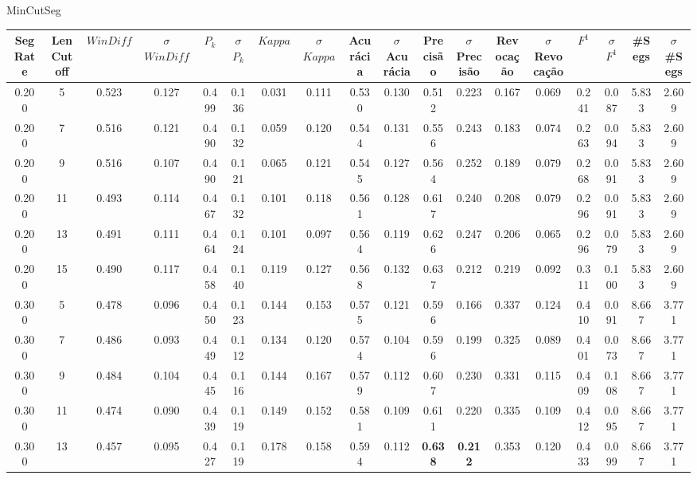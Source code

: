  \newpage
 \center MinCutSeg
\begin{longtable}[c]{|c|c|c|c|c|c|c|c|c|c|c|c|c|c|c|c|c|c|} 
\hline 
 Seg Rate & LenCutoff & $WinDiff$ & $\sigma$$WinDiff$ & $P_k$ & $\sigma$$P_k$ & $Kappa$ & $\sigma$$Kappa$ & Acurácia & $\sigma$Acurácia & Precisão & $\sigma$Precisão & Revocação & $\sigma$Revocação & $F^1$ & $\sigma$$F^1$ & \#Segs & $\sigma$\#Segs\\ \hline 
 0.200 & 5 & 0.523 & 0.127 & 0.499 & 0.136 & 0.031 & 0.111 & 0.530 & 0.130 & 0.512 & 0.223 & 0.167 & 0.069 & 0.241 & 0.087 & 5.833 & 2.609  \\ \hline 
  0.200 & 7 & 0.516 & 0.121 & 0.490 & 0.132 & 0.059 & 0.120 & 0.544 & 0.131 & 0.556 & 0.243 & 0.183 & 0.074 & 0.263 & 0.094 & 5.833 & 2.609  \\ \hline 
  0.200 & 9 & 0.516 & 0.107 & 0.490 & 0.121 & 0.065 & 0.121 & 0.545 & 0.127 & 0.564 & 0.252 & 0.189 & 0.079 & 0.268 & 0.091 & 5.833 & 2.609  \\ \hline 
  0.200 & 11 & 0.493 & 0.114 & 0.467 & 0.132 & 0.101 & 0.118 & 0.561 & 0.128 & 0.617 & 0.240 & 0.208 & 0.079 & 0.296 & 0.091 & 5.833 & 2.609  \\ \hline 
  0.200 & 13 & 0.491 & 0.111 & 0.464 & 0.124 & 0.101 & 0.097 & 0.564 & 0.119 & 0.626 & 0.247 & 0.206 & 0.065 & 0.296 & 0.079 & 5.833 & 2.609  \\ \hline 
  0.200 & 15 & 0.490 & 0.117 & 0.458 & 0.140 & 0.119 & 0.127 & 0.568 & 0.132 & 0.637 & 0.212 & 0.219 & 0.092 & 0.311 & 0.100 & 5.833 & 2.609  \\ \hline 
  0.300 & 5 & 0.478 & 0.096 & 0.450 & 0.123 & 0.144 & 0.153 & 0.575 & 0.121 & 0.596 & 0.166 & 0.337 & 0.124 & 0.410 & 0.091 & 8.667 & 3.771  \\ \hline 
  0.300 & 7 & 0.486 & 0.093 & 0.449 & 0.112 & 0.134 & 0.120 & 0.574 & 0.104 & 0.596 & 0.199 & 0.325 & 0.089 & 0.401 & 0.073 & 8.667 & 3.771  \\ \hline 
  0.300 & 9 & 0.484 & 0.104 & 0.445 & 0.116 & 0.144 & 0.167 & 0.579 & 0.112 & 0.607 & 0.230 & 0.331 & 0.115 & 0.409 & 0.108 & 8.667 & 3.771  \\ \hline 
  0.300 & 11 & 0.474 & 0.090 & 0.439 & 0.119 & 0.149 & 0.152 & 0.581 & 0.109 & 0.611 & 0.220 & 0.335 & 0.109 & 0.412 & 0.095 & 8.667 & 3.771  \\ \hline 
  0.300 & 13 & 0.457 & 0.095 & 0.427 & 0.119 & 0.178 & 0.158 & 0.594 & 0.112 & \cellcolor{gray!20} \textbf{0.638} & \cellcolor{gray!20} \textbf{0.212} & 0.353 & 0.120 & 0.433 & 0.099 & 8.667 & 3.771  \\ \hline 

\end{longtable}
